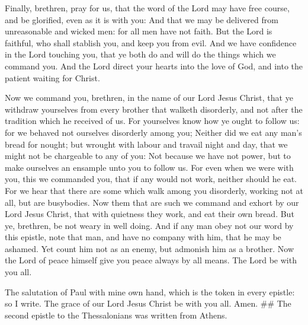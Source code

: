  Finally, brethren, pray for us, that the word of the Lord
may have free course, and be glorified, even as it is with you:
 And that we may be delivered from unreasonable and wicked
men: for all men have not faith.  But the Lord is faithful,
who shall stablish you, and keep you from evil.  And we have
confidence in the Lord touching you, that ye both do and will do the
things which we command you.  And the Lord direct your
hearts into the love of God, and into the patient waiting for Christ.

 Now we command you, brethren, in the name of our Lord Jesus
Christ, that ye withdraw yourselves from every brother that walketh
disorderly, and not after the tradition which he received of us.
 For yourselves know how ye ought to follow us: for we
behaved not ourselves disorderly among you;  Neither did we
eat any man's bread for nought; but wrought with labour and travail
night and day, that we might not be chargeable to any of you:
 Not because we have not power, but to make ourselves an
ensample unto you to follow us.  For even when we were with
you, this we commanded you, that if any would not work, neither should
he eat.  For we hear that there are some which walk among
you disorderly, working not at all, but are busybodies. 
Now them that are such we command and exhort by our Lord Jesus Christ,
that with quietness they work, and eat their own bread. 
But ye, brethren, be not weary in well doing.  And if any
man obey not our word by this epistle, note that man, and have no
company with him, that he may be ashamed.  Yet count him
not as an enemy, but admonish him as a brother.  Now the
Lord of peace himself give you peace always by all means. The Lord be
with you all.

 The salutation of Paul with mine own hand, which is the
token in every epistle: so I write.  The grace of our Lord
Jesus Christ be with you all. Amen. \#\# The second epistle to the
Thessalonians was written from Athens.
